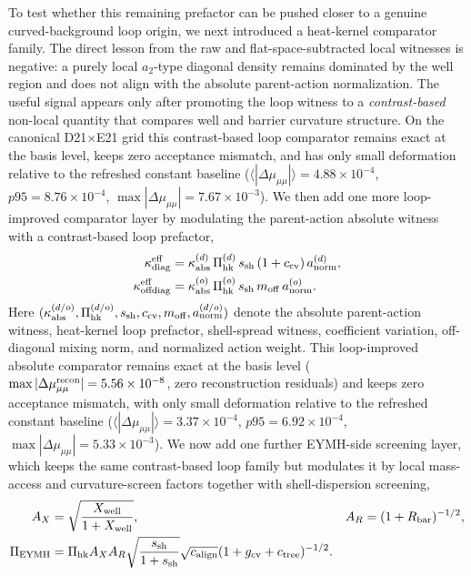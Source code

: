 \documentclass[aps,prd,onecolumn,notitlepage,nofootinbib,superscriptaddress,11pt,floatfix]{revtex4-2}
\begin{document}
To test whether this remaining prefactor can be pushed closer to a genuine curved-background loop origin, we next introduced a heat-kernel comparator family. The direct lesson from the raw and flat-space-subtracted local witnesses is negative: a purely local $a_2$-type diagonal density remains dominated by the well region and does not align with the absolute parent-action normalization. The useful signal appears only after promoting the loop witness to a \emph{contrast-based} non-local quantity that compares well and barrier curvature structure. On the canonical D21$\times$E21 grid this contrast-based loop comparator remains exact at the basis level, keeps zero acceptance mismatch, and has only small deformation relative to the refreshed constant baseline ($\langle|\Delta\mu_{\mu\mu}|\rangle=4.88\times10^{-4}$, $p95=8.76\times10^{-4}$, $\max|\Delta\mu_{\mu\mu}|=7.67\times10^{-3}$). We then add one more loop-improved comparator layer by modulating the parent-action absolute witness with a contrast-based loop prefactor,
\begin{align}
\kappa_{\rm diag}^{\rm eff}
&=
 \kappa_{\rm abs}^{(d)}\,
 \Pi_{\rm hk}^{(d)}\,
 s_{\rm sh}\,
 (1+c_{\rm cv})\,
 a_{\rm norm}^{(d)},
\\
\kappa_{\rm offdiag}^{\rm eff}
&=
 \kappa_{\rm abs}^{(o)}\,
 \Pi_{\rm hk}^{(o)}\,
 s_{\rm sh}\,
 m_{\rm off}\,
 a_{\rm norm}^{(o)}.
\end{align}
Here $(\kappa_{\rm abs}^{(d/o)},\Pi_{\rm hk}^{(d/o)},s_{\rm sh},c_{\rm cv},m_{\rm off},a_{\rm norm}^{(d/o)})$ denote the absolute parent-action witness, heat-kernel loop prefactor, shell-spread witness, coefficient variation, off-diagonal mixing norm, and normalized action weight. This loop-improved absolute comparator remains exact at the basis level ($\max|\Delta \mu_{\mu\mu}^{\rm recon}|=5.56\times10^{-8}$, zero reconstruction residuals) and keeps zero acceptance mismatch, with only small deformation relative to the refreshed constant baseline ($\langle|\Delta\mu_{\mu\mu}|\rangle=3.37\times10^{-4}$, $p95=6.92\times10^{-4}$, $\max|\Delta\mu_{\mu\mu}|=5.33\times10^{-3}$).
We now add one further EYMH-side screening layer, which keeps the same contrast-based loop family but modulates it by local mass-access and curvature-screen factors together with shell-dispersion screening,
\begin{align}
A_X &= \sqrt{\frac{X_{\rm well}}{1+X_{\rm well}}},
&
A_R &= (1+R_{\rm bar})^{-1/2},\\
\Pi_{\rm EYMH}
&=
\Pi_{\rm hk}
 A_X A_R
 \sqrt{\frac{s_{\rm sh}}{1+s_{\rm sh}}}
 \sqrt{c_{\rm align}}
 (1+g_{\rm cv}+c_{\rm tree})^{-1/2}.
\end{align}
\end{document}
